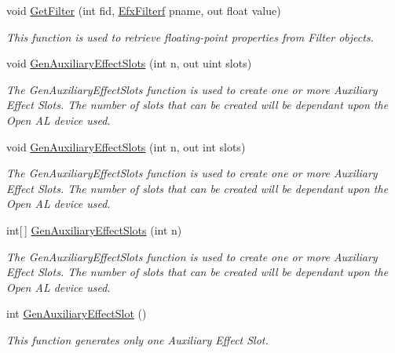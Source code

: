 \begin{DoxyCompactItemize}
void \hyperlink{class_open_t_k_1_1_audio_1_1_open_a_l_1_1_effects_extension_a5ef9cded2ef47728599dd2e748a81c67}{Get\-Filter} (int fid, \hyperlink{namespace_open_t_k_1_1_audio_1_1_open_a_l_a6a389aa5e465025fe4eb3fba1603fd6b}{Efx\-Filterf} pname, out float value)
\begin{DoxyCompactList}\small\item\em This function is used to retrieve floating-\/point properties from Filter objects.\end{DoxyCompactList}\item 
void \hyperlink{class_open_t_k_1_1_audio_1_1_open_a_l_1_1_effects_extension_af443312a2d154ede7f865e8cd765d797}{Gen\-Auxiliary\-Effect\-Slots} (int n, out uint slots)
\begin{DoxyCompactList}\small\item\em The Gen\-Auxiliary\-Effect\-Slots function is used to create one or more Auxiliary Effect Slots. The number of slots that can be created will be dependant upon the Open A\-L device used.\end{DoxyCompactList}\item 
void \hyperlink{class_open_t_k_1_1_audio_1_1_open_a_l_1_1_effects_extension_a5d2ee7f74d4228bbf10c92f61c97f869}{Gen\-Auxiliary\-Effect\-Slots} (int n, out int slots)
\begin{DoxyCompactList}\small\item\em The Gen\-Auxiliary\-Effect\-Slots function is used to create one or more Auxiliary Effect Slots. The number of slots that can be created will be dependant upon the Open A\-L device used.\end{DoxyCompactList}\item 
int\mbox{[}$\,$\mbox{]} \hyperlink{class_open_t_k_1_1_audio_1_1_open_a_l_1_1_effects_extension_a0ec3a249a109ba80461d8fb71072de71}{Gen\-Auxiliary\-Effect\-Slots} (int n)
\begin{DoxyCompactList}\small\item\em The Gen\-Auxiliary\-Effect\-Slots function is used to create one or more Auxiliary Effect Slots. The number of slots that can be created will be dependant upon the Open A\-L device used.\end{DoxyCompactList}\item 
int \hyperlink{class_open_t_k_1_1_audio_1_1_open_a_l_1_1_effects_extension_afbbb3f2126518c17bc067ee922021245}{Gen\-Auxiliary\-Effect\-Slot} ()
\begin{DoxyCompactList}\small\item\em This function generates only one Auxiliary Effect Slot.\end{DoxyCompactList}\item 

\end{DoxyCompactItemize}
